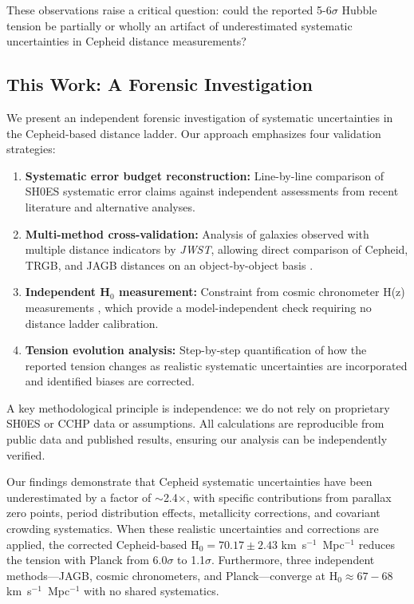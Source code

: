 \documentclass[twocolumn, linenumbers]{aastex701}
\begin{document}
These observations raise a critical question: could the reported 5-6$\sigma$ Hubble tension be partially or wholly an artifact of underestimated systematic uncertainties in Cepheid distance measurements?

\subsection{This Work: A Forensic Investigation}

We present an independent forensic investigation of systematic uncertainties in the Cepheid-based distance ladder. Our approach emphasizes four validation strategies:

\begin{enumerate}
\item \textbf{Systematic error budget reconstruction:} Line-by-line comparison of SH0ES systematic error claims against independent assessments from recent literature and alternative analyses.

\item \textbf{Multi-method cross-validation:} Analysis of galaxies observed with multiple distance indicators by \textit{JWST}, allowing direct comparison of Cepheid, TRGB, and JAGB distances on an object-by-object basis \citep{Freedman2024}.

\item \textbf{Independent H$_0$ measurement:} Constraint from cosmic chronometer H(z) measurements \citep{Moresco2022}, which provide a model-independent check requiring no distance ladder calibration.

\item \textbf{Tension evolution analysis:} Step-by-step quantification of how the reported tension changes as realistic systematic uncertainties are incorporated and identified biases are corrected.
\end{enumerate}

A key methodological principle is independence: we do not rely on proprietary SH0ES or CCHP data or assumptions. All calculations are reproducible from public data and published results, ensuring our analysis can be independently verified.

Our findings demonstrate that Cepheid systematic uncertainties have been underestimated by a factor of $\sim$2.4$\times$, with specific contributions from parallax zero points, period distribution effects, metallicity corrections, and covariant crowding systematics. When these realistic uncertainties and corrections are applied, the corrected Cepheid-based H$_0 = 70.17 \pm 2.43$ km~s$^{-1}$~Mpc$^{-1}$ reduces the tension with Planck from 6.0$\sigma$ to 1.1$\sigma$. Furthermore, three independent methods---JAGB, cosmic chronometers, and Planck---converge at H$_0 \approx 67-68$ km~s$^{-1}$~Mpc$^{-1}$ with no shared systematics.
\end{document}
